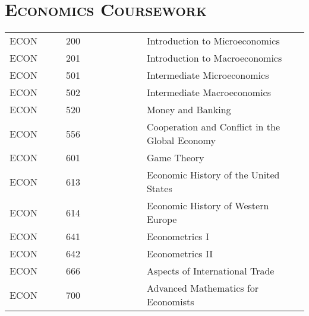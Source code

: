 \begin{resume}

\begin{formatb}
   \\
  \body\\
\end{formatb}


\section{\textsc{Economics Coursework}}
\begin{tabular}{lllll}
ECON      & \ \ & 200  & \ \ \ \ \ \ \ \ \ \ &  Introduction to Microeconomics \\
ECON      & \ \ & 201  & \ \ &  Introduction to Macroeconomics \\
ECON      & \ \ & 501  & \ \ &  Intermediate Microeconomics \\
ECON      & \ \ & 502  & \ \ &  Intermediate Macroeconomics \\
ECON      & \ \ & 520  & \ \ &  Money and Banking \\
ECON      & \ \ & 556  & \ \ &  Cooperation and Conflict in the Global Economy \\
ECON      & \ \ & 601  & \ \ &  Game Theory\\
ECON      & \ \ & 613  & \ \ &  Economic History of the United States \\
ECON      & \ \ & 614  & \ \ &  Economic History of Western Europe \\
ECON      & \ \ & 641  & \ \ &  Econometrics I\\
ECON      & \ \ & 642  & \ \ &  Econometrics II\\
ECON      & \ \ & 666  & \ \ &  Aspects of International Trade \\
ECON      & \ \ & 700  & \ \ &  Advanced Mathematics for Economists \\
\end{tabular}



\end{resume}




